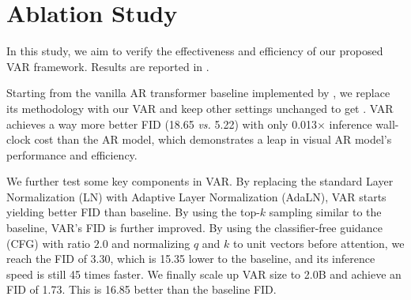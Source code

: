 \section{Ablation Study} \label{sec:abla}

In this study, we aim to verify the effectiveness and efficiency of our proposed VAR framework.
Results are reported in .

 Starting from the vanilla AR transformer baseline implemented by \cite{maskgit}, we replace its methodology with our VAR and keep other settings unchanged to get . VAR achieves a way more better FID (18.65 \textit{vs.} 5.22) with only 0.013$\times$ inference wall-clock cost than the AR model, which demonstrates a leap in visual AR model's performance and efficiency.

 We further test some key components in VAR. By replacing the standard Layer Normalization (LN) with Adaptive Layer Normalization (AdaLN), VAR starts yielding better FID than baseline. By using the top-$k$ sampling similar to the baseline, VAR's FID is further improved. By using the classifier-free guidance (CFG) with ratio $2.0$ and normalizing $q$ and $k$ to unit vectors before attention, we reach the FID of 3.30, which is 15.35 lower to the baseline, and its inference speed is still 45 times faster. We finally scale up VAR size to 2.0B and achieve an FID of 1.73. This is 16.85 better than the baseline FID.

    